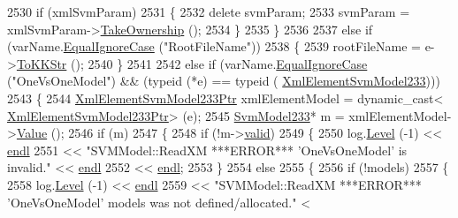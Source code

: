 \begin{DoxyCode}
2530         \textcolor{keywordflow}{if}  (xmlSvmParam)
2531         \{
2532           \textcolor{keyword}{delete}  svmParam;
2533           svmParam = xmlSvmParam->\hyperlink{class_k_k_b_1_1_xml_element_template_a1fd0ce7b0d0ee0d57fb29ca09d3ad6fc}{TakeOwnership} ();
2534         \}
2535       \}
2536 
2537       \textcolor{keywordflow}{else} \textcolor{keywordflow}{if}  (varName.\hyperlink{class_k_k_b_1_1_k_k_str_a562f9696417c53f66bc4088eac072ab5}{EqualIgnoreCase} (\textcolor{stringliteral}{"RootFileName"}))
2538       \{
2539         rootFileName = e->\hyperlink{class_k_k_b_1_1_xml_element_a3028fc03b79509e6378749f6a8b426b9}{ToKKStr} ();
2540       \}
2541 
2542       \textcolor{keywordflow}{else} \textcolor{keywordflow}{if}  (varName.\hyperlink{class_k_k_b_1_1_k_k_str_a562f9696417c53f66bc4088eac072ab5}{EqualIgnoreCase} (\textcolor{stringliteral}{"OneVsOneModel"})  &&  (\textcolor{keyword}{typeid} (*e) == \textcolor{keyword}{typeid} (
      \hyperlink{namespace_s_v_m233_ac980a127b814b032d64ad46c43530ac0}{XmlElementSvmModel233})))
2543       \{
2544         \hyperlink{class_k_k_b_1_1_xml_element_template}{XmlElementSvmModel233Ptr} xmlElementModel = \textcolor{keyword}{dynamic\_cast<}
      \hyperlink{class_k_k_b_1_1_xml_element_template}{XmlElementSvmModel233Ptr}\textcolor{keyword}{>} (e);
2545         \hyperlink{struct_s_v_m233_1_1_svm_model233}{SvmModel233}* m = xmlElementModel->\hyperlink{class_k_k_b_1_1_xml_element_template_a3d671b57251b4b256fecb2197fc4a0f4}{Value} ();
2546         \textcolor{keywordflow}{if}  (m)
2547         \{
2548           \textcolor{keywordflow}{if}  (!m->\hyperlink{struct_s_v_m233_1_1_svm_model233_a875589b5c20a1d5a3b2d21d88706abc0}{valid})
2549           \{
2550             log.\hyperlink{class_k_k_b_1_1_run_log_a32cf761d7f2e747465fd80533fdbb659}{Level} (-1) << \hyperlink{namespace_k_k_b_ad1f50f65af6adc8fa9e6f62d007818a8}{endl}
2551               << \textcolor{stringliteral}{"SVMModel::ReadXM   ***ERROR***   'OneVsOneModel'  is invalid."} << 
      \hyperlink{namespace_k_k_b_ad1f50f65af6adc8fa9e6f62d007818a8}{endl}
2552               << \hyperlink{namespace_k_k_b_ad1f50f65af6adc8fa9e6f62d007818a8}{endl};
2553           \}
2554           \textcolor{keywordflow}{else}
2555           \{
2556             \textcolor{keywordflow}{if}  (!models)
2557             \{
2558               log.\hyperlink{class_k_k_b_1_1_run_log_a32cf761d7f2e747465fd80533fdbb659}{Level} (-1) << \hyperlink{namespace_k_k_b_ad1f50f65af6adc8fa9e6f62d007818a8}{endl}
2559                 << \textcolor{stringliteral}{"SVMModel::ReadXM   ***ERROR***   'OneVsOneModel'   models was not defined/allocated."} <

\end{DoxyCode}
